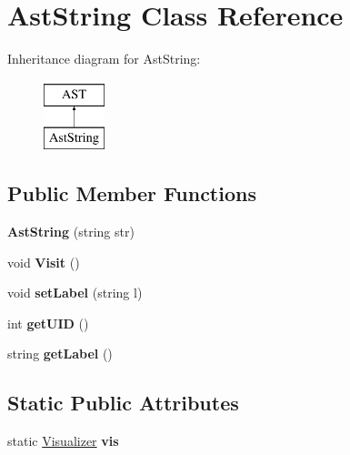 \hypertarget{classAstString}{\section{Ast\-String Class Reference}
\label{classAstString}
}
Inheritance diagram for Ast\-String\-:\begin{figure}[H]
\begin{center}
\leavevmode
\includegraphics[height=2.000000cm]{classAstString}
\end{center}
\end{figure}
\subsection*{Public Member Functions}
\begin{DoxyCompactItemize}
\item 
\hypertarget{classAstString_a7a4dfa0949d876400dc288b299274d51}{{\bfseries Ast\-String} (string str)}\label{classAstString_a7a4dfa0949d876400dc288b299274d51}

\item 
\hypertarget{classAstString_a0a7a6576cf72bfbcd2f78c7ffb9350bb}{void {\bfseries Visit} ()}\label{classAstString_a0a7a6576cf72bfbcd2f78c7ffb9350bb}

\item 
\hypertarget{classAST_a71d680856e95ff89f55d5311a552eba6}{void {\bfseries set\-Label} (string l)}\label{classAST_a71d680856e95ff89f55d5311a552eba6}

\item 
\hypertarget{classAST_ab7a5b1d9f1c2de0d98deb356f724a42c}{int {\bfseries get\-U\-I\-D} ()}\label{classAST_ab7a5b1d9f1c2de0d98deb356f724a42c}

\item 
\hypertarget{classAST_aee029be902fffc927d16ccb03eb922ad}{string {\bfseries get\-Label} ()}\label{classAST_aee029be902fffc927d16ccb03eb922ad}

\end{DoxyCompactItemize}
\subsection*{Static Public Attributes}
\begin{DoxyCompactItemize}
\item 
\hypertarget{classAST_aca9e6637209b31e03a09c0d42f29bdfa}{static \hyperlink{classVisualizer}{Visualizer} {\bfseries vis}}\label{classAST_aca9e6637209b31e03a09c0d42f29bdfa}

\end{DoxyCompactItemize}
